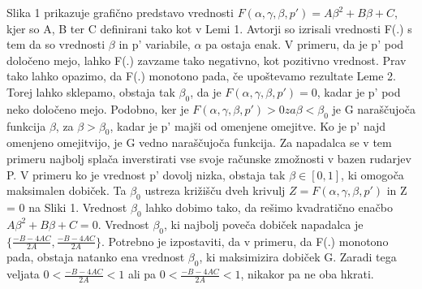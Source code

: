\documentclass[12pt]{article}
\begin{document}
Slika 1 prikazuje grafično predstavo vrednosti $ F(\alpha, \gamma, \beta, p') = A\beta^2 + B\beta + C $, kjer so A, B ter C definirani tako kot v Lemi 1. Avtorji so izrisali vrednosti F(.) s tem da so vrednosti $\beta$ in p' variabile, $\alpha$ pa ostaja enak. V primeru, da je p' pod določeno mejo, lahko F(.) zavzame tako negativno, kot pozitivno vrednost. Prav tako lahko opazimo, da F(.) monotono pada, če upoštevamo rezultate Leme 2. Torej lahko sklepamo, obstaja tak $\beta_0$, da je $ F(\alpha, \gamma, \beta, p') = 0 $, kadar je p' pod neko določeno mejo. Podobno, ker je $ F(\alpha, \gamma, \beta, p') > 0 za \beta < \beta_0 $ je G naraščujoča funkcija $\beta$, za $\beta > \beta_0$, kadar je p' majši od omenjene omejitve. Ko je p' najd omenjeno omejitvijo, je G vedno naraščujoča funkcija. Za napadalca se v tem primeru najbolj splača inverstirati vse svoje računske zmožnosti v bazen rudarjev P. V primeru ko je vrednost p' dovolj nizka, obstaja tak $\beta \in [0, 1]$, ki omogoča maksimalen dobiček. Ta $\beta_0$ ustreza križišču dveh krivulj $Z = F(\alpha, \gamma, \beta, p')$ in Z = 0 na Sliki 1. Vrednost $\beta_0$ lahko dobimo tako, da rešimo kvadratično enačbo $A\beta^2 + B\beta + C = 0$. Vrednost $\beta_0$, ki najbolj poveča dobiček napadalca je $\{\frac{-B - 4AC}{2A}, \frac{-B -4AC}{2A}\}$.
\newline
Potrebno je izpostaviti, da v primeru, da F(.) monotono pada, obstaja natanko ena vrednost $\beta_0$, ki maksimizira dobiček G. Zaradi tega veljata $0 < \frac{-B-4AC}{2A} < 1$ ali pa $0 < \frac{-B - 4 AC}{2A} < 1$, nikakor pa ne oba hkrati.
\end{document}
